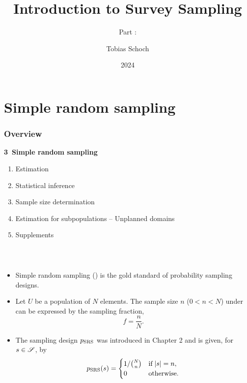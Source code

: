 \documentclass{my_eth_beamer}
\title{Introduction to Survey Sampling}
\subtitle{Part \NR: \TITLE}
\author[Tobias Schoch]{Tobias Schoch}
\date{2024}
\numberwithin{equation}{section}
\newcommand{\TITLE}{Simple random sampling}
\newcommand{\NR}{3}
\begin{document}

\section{\TITLE}\label{sec:srs}
\setcounter{section}{\NR}
\setcounter{Bsp}{10}
\setcounter{Def}{10}
\setcounter{EinSatz}{1}

\begin{frame}
    \frametitle{Overview}
    \noindent \hspace{0.2em}\textcolor{fhnwblue}{\bfseries \NR~\TITLE}
    \begin{enumerate}[\NR.1]
        \item Estimation
        \item Statistical inference
        \item Sample size determination
        \item Estimation for subpopulations -- Unplanned domains
        \item Supplements
    \end{enumerate}
\end{frame}

\begin{frame}
    \frametitle{\insertsectionnumber~\insertsection}
    \begin{itemize}
    \setlength{\itemsep}{10pt}
        \item Simple random sampling (\SRS) is the \alert{gold standard} of
            probability sampling designs.
        \item Let $U$ be a population of $N$ elements. The sample size $n$
            ($0 < n < N$) under \SRS can be expressed by the
            \alert{sampling fraction},
            \begin{equation*}
                f = \frac{n}{N}.
            \end{equation*}
        \item The \alert{sampling design} $p_{\mathrm{SRS}}$ was introduced in
            Chapter 2 and is given, for $s \in \mathscr{S}$, by
            \begin{equation*}
                p_{\mathrm{SRS}}(s) = \begin{cases}
                        1 / \binom{N}{n} & \text{if} \; \vert s \vert = n,\\
                        0 & \text{otherwise}.
                    \end{cases}
            \end{equation*}
    \end{itemize}
\end{frame}
\end{document}
